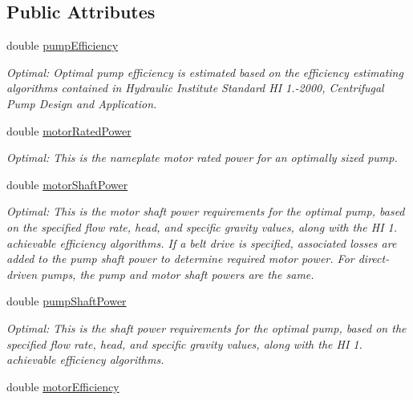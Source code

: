 \subsection*{Public Attributes}
\begin{DoxyCompactItemize}
\item 
double \hyperlink{struct_p_s_a_t_result_1_1_output_ab8ba6270cd9f0da55dfbb4fdb8d5b452}{pump\+Efficiency}
\begin{DoxyCompactList}\small\item\em Optimal\+: Optimal pump efficiency is estimated based on the efficiency estimating algorithms contained in Hydraulic Institute Standard HI 1.-\/2000, Centrifugal Pump Design and Application. \end{DoxyCompactList}\item 
double \hyperlink{struct_p_s_a_t_result_1_1_output_a72f4e093c7cd3ee1ea943cebd79c2d7a}{motor\+Rated\+Power}
\begin{DoxyCompactList}\small\item\em Optimal\+: This is the nameplate motor rated power for an optimally sized pump. \end{DoxyCompactList}\item 
double \hyperlink{struct_p_s_a_t_result_1_1_output_a813a97afcb5ea5465d8b733eaa4f834c}{motor\+Shaft\+Power}
\begin{DoxyCompactList}\small\item\em Optimal\+: This is the motor shaft power requirements for the optimal pump, based on the specified flow rate, head, and specific gravity values, along with the HI 1. achievable efficiency algorithms. If a belt drive is specified, associated losses are added to the pump shaft power to determine required motor power. For direct-\/driven pumps, the pump and motor shaft powers are the same. \end{DoxyCompactList}\item 
double \hyperlink{struct_p_s_a_t_result_1_1_output_a4b3231e19e5c472035276f46826d5143}{pump\+Shaft\+Power}
\begin{DoxyCompactList}\small\item\em Optimal\+: This is the shaft power requirements for the optimal pump, based on the specified flow rate, head, and specific gravity values, along with the HI 1. achievable efficiency algorithms. \end{DoxyCompactList}\item 
double \hyperlink{struct_p_s_a_t_result_1_1_output_ad1beb6e9a1fc9bc21c50eb42ae598589}{motor\+Efficiency}

\end{DoxyCompactItemize}
